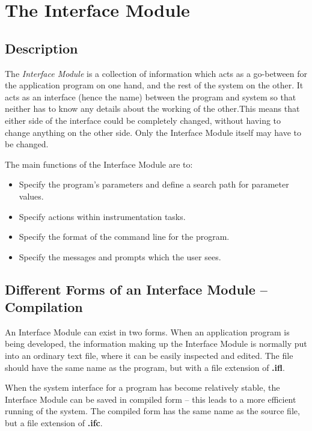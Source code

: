 \documentclass[twoside,11pt]{article}
\newcommand{\xlabel}[1]{}
\renewcommand{\_}{\texttt{\symbol{95}}}
\begin{document}
\section{The Interface Module\xlabel{the_interface_module}}

\subsection{Description\xlabel{description}}

The {\em Interface Module}\/ is a collection of information which acts as a
go-between for the application program on one hand, and the rest of the
system on the other. It acts as an interface (hence the name) between
the program and system so that neither has to know any details about
the working of the other.This means that either
side of the interface could be completely changed, without having to
change anything on the other side.
Only the Interface Module itself may have to be changed.

The main functions of the Interface Module are to:
\begin{itemize}
\item Specify the program's parameters and define a search path for
parameter values.
\item Specify actions within instrumentation tasks.
\item Specify the format of the command line for the program.
\item Specify the messages and prompts which the user sees.
\end{itemize}

\subsection{Different Forms of an Interface Module -- Compilation
\xlabel{different_forms_of_an_interface_module}}

An Interface Module can exist in two forms. When an application
program is being developed, the information making up the Interface
Module is normally put into an ordinary text file, where it can be
easily inspected and edited.
The file should have the same name as the program, but with a file
extension of {\bf .ifl}.

When the system interface for a program has become relatively stable, the
Interface Module can be saved in compiled form --
this leads to a more efficient running of the system.
The compiled form has the same name as the source file, but a file extension of
{\bf .ifc}.
\end{document}

